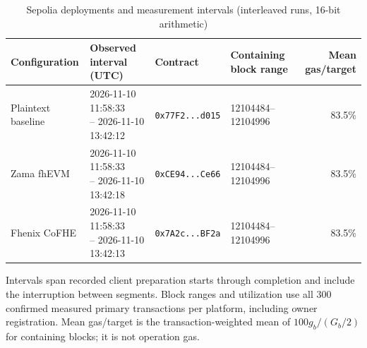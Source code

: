 \begin{table}[!t]
\caption{Sepolia deployments and measurement intervals (interleaved runs, 16-bit arithmetic)}
\label{tab:sepolia-experiment-deployments}
\centering
\footnotesize
\setlength{\tabcolsep}{4pt}
\begin{tabular}{|l|l|l|l|r|}
\hline
\textbf{Configuration} &
\textbf{Observed interval (UTC)} &
\textbf{Contract} &
\textbf{Containing block range} &
\textbf{Mean gas/target} \\
\hline
Plaintext baseline &
\shortstack[l]{2026-11-10 11:58:33 \\ -- 2026-11-10 13:42:12} &
\texttt{0x77F2...d015} &
12104484--12104996 &
83.5\% \\
\hline
Zama fhEVM &
\shortstack[l]{2026-11-10 11:58:33 \\ -- 2026-11-10 13:42:18} &
\texttt{0xCE94...Ce66} &
12104484--12104996 &
83.5\% \\
\hline
Fhenix CoFHE &
\shortstack[l]{2026-11-10 11:58:33 \\ -- 2026-11-10 13:42:13} &
\texttt{0x7A2c...BF2a} &
12104484--12104996 &
83.5\% \\
\hline
\end{tabular}
\vspace{2pt}
\parbox{\textwidth}{\scriptsize Intervals span recorded client preparation starts through completion and include the interruption between segments. Block ranges and utilization use all 300 confirmed measured primary transactions per platform, including owner registration. Mean gas/target is the transaction-weighted mean of $100g_b/(G_b/2)$ for containing blocks; it is not operation gas.}
\end{table}

